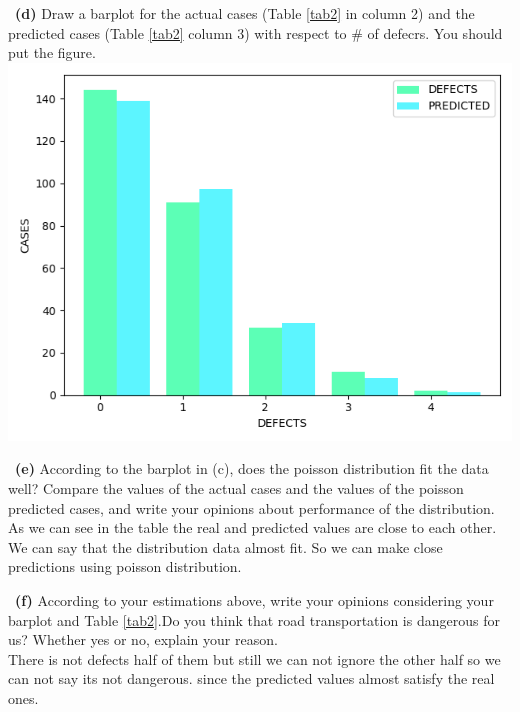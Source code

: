 \documentclass[a4 paper]{article}
\numberwithin{equation}{section}
\newcommand{\subproblem}[1]{~\newline\textbf{(#1)}}
\newcommand{\0}{\mathbf{0}}
\begin{document}
	\subproblem{d} Draw a barplot for the actual cases (Table \ref{tab2} in column 2) and the predicted cases (Table \ref{tab2} column 3) with respect to \# of defecrs. You should put the figure.\\
	\includegraphics[width=\textwidth,height=\textheight,keepaspectratio]{Figure_1.png}
	
	\subproblem{e} According to the barplot in (c), does the poisson distribution fit the data well? Compare the values of the actual cases and the values of the poisson predicted cases, and write your opinions about performance of the distribution.\\
	As we can see in the table the real and predicted values  are close to each other. We can say that the distribution data almost fit.
	So we can make close predictions using poisson distribution.
	
	\subproblem{f} According to your estimations above, write your opinions considering your barplot and Table \ref{tab2}.Do you think that road transportation is dangerous for us? Whether yes or no, explain your reason.\\
	There is not defects half of them but still we can not ignore the other half so we can not say its not dangerous. since the predicted values almost satisfy the real ones.
	
\end{document}
